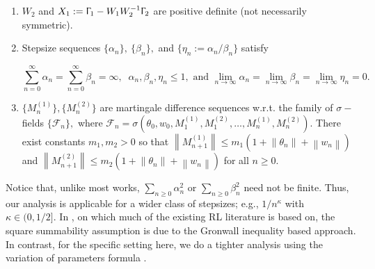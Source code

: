 \documentclass[usenames,dvipsnames,final,12pt]{colt2018} %
\newcommand{\cF}{\mathcal{F}}
\newcommand{\Xt}{X_1}
\newcommand{\Wt}{W_1}
\newcommand{\Tt}{\Upgamma_1}
\newcommand{\Mt}{M^{(1)}}
\newcommand{\st}{\alpha}
\newcommand{\mt}{m_1}
\newcommand{\Tw}{\Upgamma_2}
\newcommand{\Ww}{W_2}
\newcommand{\Mw}{M^{(2)}}
\newcommand{\sw}{\beta}
\newcommand{\mw}{m_2}
\newcommand{\cA}{\mathcal{A}}
\newcommand{\norm}[1]{\left\lVert#1\right\rVert}
\newcommand{\gal}[1]{#1}
\newcommand{\gugan}[1]{#1}
\begin{document}
{\renewcommand*\theenumi{$\pmb{\cA_\arabic{enumi}}$}
\begin{enumerate}
\item \label{assum:posDef} $\Ww$ and $\Xt := \Tt - \Wt \Ww^{-1} \Tw$ are positive definite (not necessarily symmetric).

\item \label{assum:stepSize} Stepsize sequences $\{\st_n\},~\{\sw_n\},$ and $\{\eta_n := \st_n/ \sw_n\}$ satisfy
\gugan{
\begin{equation}
\label{eqn:stepSizeBound}
\sum_{n = 0}^{\infty} \st_n = \sum_{n = 0}^{\infty} \sw_n =  \infty, \; \; \st_n,\sw_n,\eta_n   \leq 1,\mbox{ and } \lim_{n \to \infty} \st_n = \lim_{n \to \infty} \sw_n = \lim_{n \to \infty} \eta_n = 0.
\end{equation}
}
%
%		
%


\item \label{assum:Noise} $\{\Mt_n\}, \{\Mw_n\}$   are martingale difference sequences w.r.t. the \gugan{family} of $\sigma-$fields $\{\cF_n\},$ where
%
$
\cF_n = \sigma(\theta_0, w_0, \Mt_1, \Mw_1, \ldots, \Mt_n, \Mw_n).
$
%
\gugan{There exist} constants $\mt, \mw > 0$ so that
%
$
\norm{\Mt_{n + 1}} \leq \mt(1 + \norm{\theta_n} + \norm{w_n})$ and $ \norm{\Mw_{n + 1}} \leq \mw(1 + \norm{\theta_n} + \norm{w_n})
$
%
for all $n \geq 0.$
%
\end{enumerate}
}

\begin{remark}\label{remark: squre summability}
Notice that, unlike most works, $\sum_{n \geq 0} \st_n^2$ or $\sum_{n \geq 0} \sw_n^2$ need not be finite. Thus\gal{,} our analysis is applicable for a wider class of stepsizes; e.g., $1/n^\kappa$ with $\kappa \in (0,  1/2].$ \gugan{In \citep{borkar2008stochastic}, on which much of the existing RL literature is based on, the square summability assumption is due to the Gronwall inequality based approach. In contrast, for the specific setting here, we do a tighter analysis using the  variation of parameters formula \citep{lakshmikantham1998method}.}
\end{remark}
\end{document}
